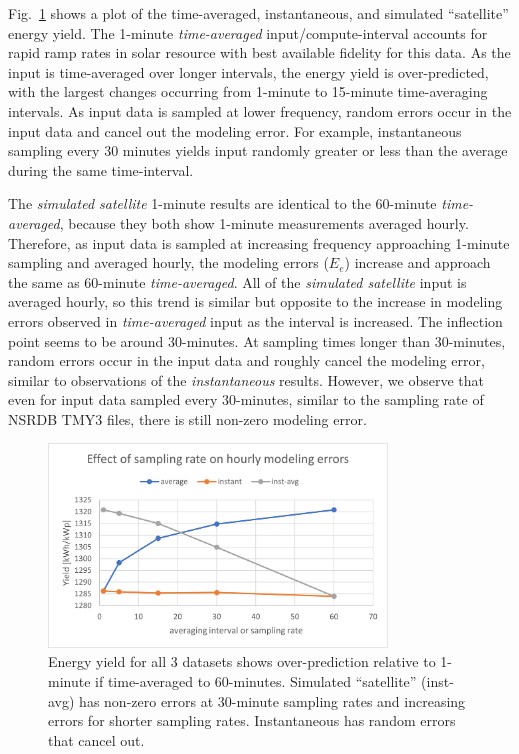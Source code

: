 \documentclass[conference]{IEEEtran}
\begin{document}
Fig.~\ref{fig:NIST-energy-yield} shows a plot of the time-averaged, instantaneous, and simulated ``satellite'' energy yield. The 1-minute \emph{time-averaged} input/compute-interval accounts for rapid ramp rates in solar resource with best available fidelity for this data. As the input is time-averaged over longer intervals, the energy yield is over-predicted, with the largest changes occurring from 1-minute to 15-minute time-averaging intervals. As input data is sampled at lower frequency, random errors occur in the input data and cancel out the modeling error. For example, instantaneous sampling every 30 minutes yields input randomly greater or less than the average during the same time-interval.

The \emph{simulated satellite} 1-minute results are identical to the 60-minute \emph{time-averaged}, because they both show 1-minute measurements averaged hourly. Therefore, as input data is sampled at increasing frequency approaching 1-minute sampling and averaged hourly, the modeling errors ($E_e$) increase and approach the same as 60-minute \emph{time-averaged}. All of the \emph{simulated satellite} input is averaged hourly, so this trend is similar but opposite to the increase in modeling errors observed in \emph{time-averaged} input as the interval is increased. The inflection point seems to be around 30-minutes. At sampling times longer than 30-minutes, random errors occur in the input data and roughly cancel the modeling error, similar to observations of the \emph{instantaneous} results. However, we observe that even for input data sampled every 30-minutes, similar to the sampling rate of NSRDB TMY3 files, there is still non-zero modeling error.

\begin{figure}[htbp]
\centerline{\includegraphics[width=9cm]{NIST_energy_yield.png}}
\caption{Energy yield for all 3 datasets shows over-prediction relative to 1-minute if time-averaged to 60-minutes. Simulated ``satellite'' (inst-avg) has non-zero errors at 30-minute sampling rates and increasing errors for shorter sampling rates. Instantaneous has random errors that cancel out.}
\label{fig:NIST-energy-yield}
\end{figure}
\end{document}
